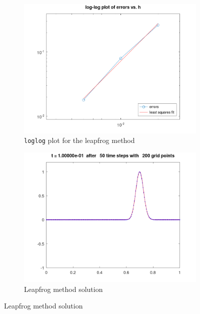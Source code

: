 \begin{solution}
    \begin{figure}[h]
        \centering
        \begin{subfigure}{0.45\textwidth}
            \includegraphics*[width=\textwidth]{problem_4a_error.png}
            \caption{\texttt{loglog} plot for the leapfrog method}
        \end{subfigure}
        \hfill
        \begin{subfigure}{0.45\textwidth}
            \includegraphics*[width=\textwidth]{problem_4a.png}
            \caption{Leapfrog method solution}
        \end{subfigure}
    \end{figure}
\end{solution}